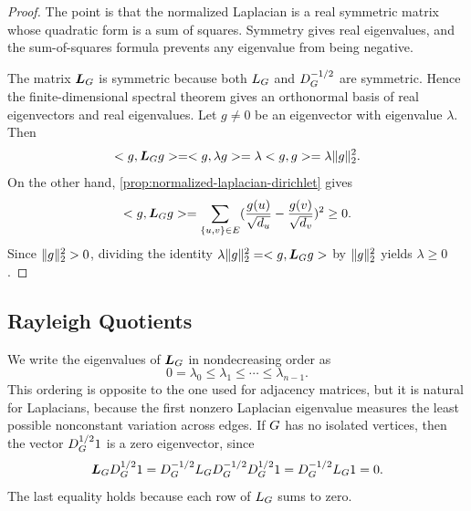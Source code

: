 \begin{proof}
	The point is that the normalized Laplacian is a real symmetric matrix whose quadratic form is a sum of squares. Symmetry gives real eigenvalues, and the sum-of-squares formula prevents any eigenvalue from being negative.

	The matrix \(\boldsymbol{L}_{G}\) is symmetric because both \(L_{G}\) and \(D_{G}^{-1/2}\) are symmetric. Hence the finite-dimensional spectral theorem gives an orthonormal basis of real eigenvectors and real eigenvalues. Let \(g\neq 0\) be an eigenvector with eigenvalue \(\lambda\). Then
	\begin{equation}
		< g,\boldsymbol{L}_{G}g>=< g,\lambda g>=\lambda< g,g>=\lambda\lVert g\rVert_2^2.
	\end{equation}
	On the other hand, \cref{prop:normalized-laplacian-dirichlet} gives
	\begin{equation}
		< g,\boldsymbol{L}_{G}g>=\sum_{\{u,v\}\in E}(\frac{g(u)}{\sqrt{d_u}}-\frac{g(v)}{\sqrt{d_v}})^2\geq 0.
	\end{equation}
	Since \(\lVert g\rVert_2^2>0\), dividing the identity \(\lambda\lVert g\rVert_2^2=< g,\boldsymbol{L}_{G}g>\) by \(\lVert g\rVert_2^2\) yields \(\lambda\geq 0\).
\end{proof}

\subsection{Rayleigh Quotients}
\label{subsec:laplacian-rayleigh-quotients}

We write the eigenvalues of \(\boldsymbol{L}_{G}\) in nondecreasing order as
\begin{equation}
	0=\lambda_0\leq \lambda_1\leq\cdots\leq \lambda_{n-1}.
\end{equation}
This ordering is opposite to the one used for adjacency matrices, but it is natural for Laplacians, because the first nonzero Laplacian eigenvalue measures the least possible nonconstant variation across edges. If \(G\) has no isolated vertices, then the vector \(D_{G}^{1/2}1\) is a zero eigenvector, since
\begin{equation}
	\boldsymbol{L}_{G}D_{G}^{1/2}1
	=
	D_{G}^{-1/2}L_{G}D_{G}^{-1/2}D_{G}^{1/2}1
	=
	D_{G}^{-1/2}L_{G}1
	=
	0.
\end{equation}
The last equality holds because each row of \(L_{G}\) sums to zero.

